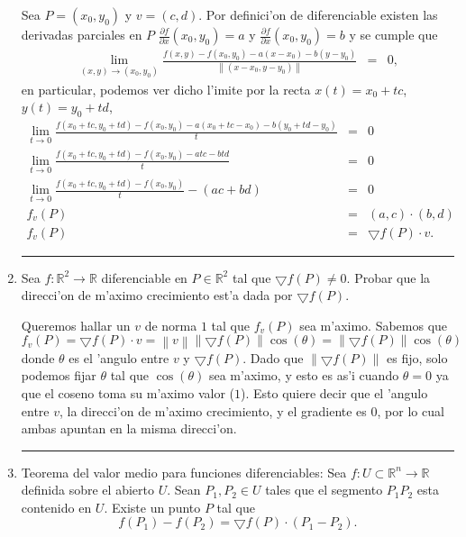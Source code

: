 \documentclass[a4paper,spanish]{article}
\newcommand{\R}[0]{\mathbb{R}}
\newcommand{\norma}[1]{\left\|#1\right\|}
\newcommand{\limite}[2]{\lim_{ #1 \rightarrow #2}}
\newcommand{\parcial}[2]{\frac{\partial #1}{\partial #2}}
\newcommand{\grad}[0]{\bigtriangledown}
\newenvironment{demo}{{\noindent \textbf{Demo: }}}{\hfill\rule{2mm}{2mm}\par}
\begin{document}
\begin{enumerate}
\begin{demo}
Sea $P = (x_0,y_0)$ y $v = (c,d)$. Por definici'on de diferenciable existen 
las derivadas parciales en $P$ $\parcial{f}{x}(x_0,y_0) = a$ y
$\parcial{f}{x}(x_0,y_0) = b$ y se cumple que
\begin{eqnarray*}
\limite{(x,y)}{(x_0,y_0)} \frac{f(x,y) - f(x_0,y_0) - a(x-x_0) - b(y-y_0)}
                                 { \norma{(x-x_0,y-y_0)}} &=& 0,
\end{eqnarray*}
en particular, podemos ver dicho l'imite por la recta $x(t)=x_0+tc$, 
$y(t)=y_0+td$,
\begin{eqnarray*}
\limite{t}{0} 
	\frac{f(x_0+tc,y_0+td) - f(x_0,y_0) - a(x_0+tc-x_0) - b(y_0+td-y_0)}
                                 {t} &=& 0 \\
\limite{t}{0} 
	\frac{f(x_0+tc,y_0+td) - f(x_0,y_0) - atc - btd}
                                 {t} &=& 0 \\
\limite{t}{0} 
	\frac{f(x_0+tc,y_0+td) - f(x_0,y_0)}{t} - (ac + bd) &=& 0 \\
f_v(P) &=& (a,c) \cdot (b,d)\\
f_v(P) &=& \grad f(P) \cdot v.
\end{eqnarray*}
\end{demo}

\item Sea $f : \R^2 \to \R$ diferenciable en $P \in \R^2$ tal que
$\grad f(P) \neq 0$. Probar que la direcci'on de m'aximo crecimiento est'a
dada por $\grad f(P)$.

\begin{demo}
Queremos hallar un $v$ de norma $1$ tal que $f_v(P)$ sea m'aximo. Sabemos que
$f_v(P) = \grad f(P) \cdot v = \norma{v} \norma{\grad f(P)} \cos(\theta) = 
\norma{\grad f(P)} \cos(\theta)$
donde $\theta$ es el 'angulo entre $v$ y $\grad f(P)$. Dado que
$\norma{\grad f(P)}$ es fijo, solo podemos fijar $\theta$ tal que
$\cos(\theta)$ sea m'aximo, y esto es as'i cuando $\theta = 0$ ya que el coseno
toma su m'aximo valor ($1$). Esto quiere decir que el 'angulo entre $v$, 
la direcci'on de m'aximo crecimiento, y el gradiente es $0$, por lo cual ambas
apuntan en la misma direcci'on.
\end{demo}

\item Teorema del valor medio para funciones diferenciables: Sea 
$f : U \subset \R^n \to \R$ definida sobre el abierto $U$. Sean 
$P_1,P_2 \in U$ tales que el segmento $P_1 P_2$ esta contenido en $U$. Existe
un punto $P$ tal que
$$f(P_1) - f(P_2) = \grad f(P) \cdot (P_1 - P_2).$$


\end{enumerate}
\end{document}
